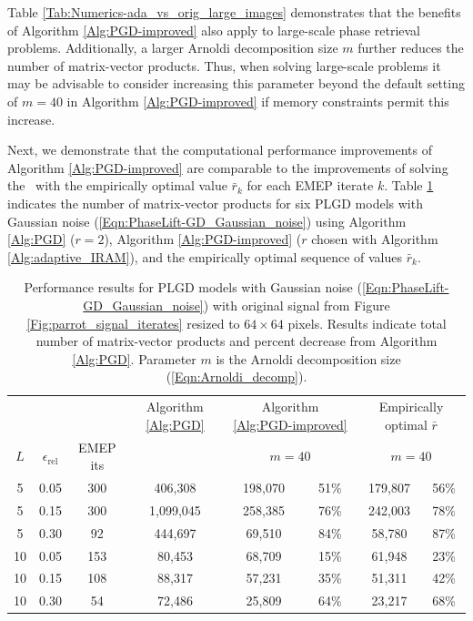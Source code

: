 

Table \ref{Tab:Numerics-ada_vs_orig_large_images} demonstrates that the benefits of Algorithm \ref{Alg:PGD-improved} also apply to large-scale phase retrieval problems.
Additionally, a larger Arnoldi decomposition size $m$ further reduces the number of matrix-vector products.
Thus, when solving large-scale problems it may be advisable to consider increasing this parameter beyond the default setting of $m=40$ in Algorithm \ref{Alg:PGD-improved} if memory constraints permit this increase.




Next, we demonstrate that the computational performance improvements of Algorithm \ref{Alg:PGD-improved} are comparable to the improvements of solving the \emep \ with the empirically optimal value $\bar{r}_k$ for each EMEP iterate $k$.
Table \ref{Tab:Numerics-num_matvecs_opt_vs_ada} indicates the number of matrix-vector products for six PLGD models with Gaussian noise (\ref{Eqn:PhaseLift-GD_Gaussian_noise}) using Algorithm \ref{Alg:PGD} ($r=2$), Algorithm \ref{Alg:PGD-improved} ($r$ chosen with Algorithm \ref{Alg:adaptive_IRAM}), and the empirically optimal sequence of values $\bar{r}_k$.



\begin{table}[H]
\centering
\begin{tabular}{ |ccc|c|cc|cc| }
 \hline
			&&&  Algorithm \ref{Alg:PGD}
			&	\multicolumn{2}{c|}{Algorithm \ref{Alg:PGD-improved}  }
			&  \multicolumn{2}{c|}{ Empirically optimal $\bar{r}$ }	\\
$L$ & $\epsilon_\text{rel}$ & EMEP its &  	& \multicolumn{2}{c|}{ $m=40$ }  & \multicolumn{2}{c|}{$m=40$}   \\
 \hline
 5 &  0.05 & 300 &  406,308  &  198,070 & 51\% &  179,807 & 56\%  \\ 
  5 &  0.15 & 300 & 1,099,045  &  258,385 & 76\% &  242,003 & 78\%  \\ 
  5 &  0.30 &  92 &  444,697  &   69,510 & 84\% &   58,780 & 87\%  \\ 
 10 &  0.05 & 153 &   80,453  &   68,709 & 15\% &   61,948 & 23\%  \\ 
 10 &  0.15 & 108 &   88,317  &   57,231 & 35\% &   51,311 & 42\%  \\ 
 10 &  0.30 &  54 &   72,486  &   25,809 & 64\% &   23,217 & 68\%  \\ 
 \hline
\end{tabular}

\caption{
Performance results for PLGD models with Gaussian noise (\ref{Eqn:PhaseLift-GD_Gaussian_noise}) with original signal from Figure \ref{Fig:parrot_signal_iterates} resized to $64 \times 64$ pixels.
Results indicate total number of matrix-vector products and percent decrease from Algorithm \ref{Alg:PGD}.
Parameter $m$ is the Arnoldi decomposition size (\ref{Eqn:Arnoldi_decomp}).
} \label{Tab:Numerics-num_matvecs_opt_vs_ada}
\end{table}


